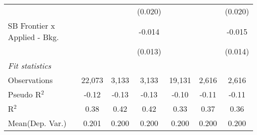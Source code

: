 \begin{tabular}{lcccccc}
                                  &                &                & (0.020)       &                &                & (0.020)\\   
   SB Frontier x Applied - Bkg.   &                &                & -0.014        &                &                & -0.015\\   
                                  &                &                & (0.013)       &                &                & (0.014)\\   
   \midrule
   \emph{Fit statistics}\\
   Observations                   & 22,073         & 3,133          & 3,133         & 19,131         & 2,616          & 2,616\\  
   Pseudo R$^2$                   & -0.12          & -0.13          & -0.13         & -0.10          & -0.11          & -0.11\\  
   R$^2$                          & 0.38           & 0.42           & 0.42          & 0.33           & 0.37           & 0.36\\  
Mean(Dep. Var.) & 0.201 & 0.200 & 0.200 & 0.200 & 0.200 & 0.200 \\
   

\end{tabular}
